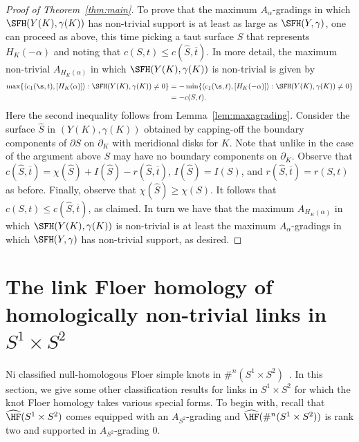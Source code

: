 \documentclass{amsart}
\theoremstyle{definition}
\theoremstyle{remark}
\numberwithin{equation}{section}
\begin{document}
\begin{proof}[Proof of Theorem~\ref{thm:main}]
  To prove that the maximum $A_\alpha$-gradings in which $\SFH(Y(K),\gamma(K))$ has non-trivial support is at least as large as $\SFH(Y,\gamma)$, one can proceed as above, this time picking a taut surface $S$ that represents $H_K(-\alpha)$ and noting that $c(S,t)\leq c(\widehat{S},\overline{t})$. In more detail, the maximum non-trivial $A_{H_K(\alpha)}$ in which $\SFH(Y(K),\gamma(K))$ is non-trivial is given by \begin{align*}\max\{\langle c_1(\s,t),[H_K(\alpha)]\rangle:\SFH(Y(K),\gamma(K))\neq 0\}&=-\min\{\langle c_1(\s,t),[H_K(-\alpha)]\rangle:\SFH(Y(K),\gamma(K))\neq 0\}\\&= -c(S,t). \end{align*} Here the second inequality follows from Lemma~\ref{lem:maxagrading}. Consider the surface $\widehat{S}$ in $(Y(K),\gamma(K))$ obtained by capping-off the boundary components of $\partial S$ on $\partial_K$ with meridional disks for $K$. Note that unlike in the case of the argument above $S$ may have no boundary components on $\partial_K$. Observe that $c(\widehat{S},\overline{t})=\chi(\widehat{S})+I(\widehat{S})-r(\widehat{S},\overline{t})$, $I(\widehat{S})=I(S)$, and $r(\widehat{S},\overline{t})=r(S,t)$ as before.  Finally, observe that $\chi(\widehat{S})\geq\chi(S)$. It follows that $c(S,t)\leq c(\widehat{S},\overline{t})$, as claimed. In turn we have that the maximum $A_{H_K(\alpha)}$ in which $\SFH(Y(K),\gamma(K))$ is non-trivial is at least the maximum $A_\alpha$-gradings in which $\SFH(Y,\gamma)$ has non-trivial support, as desired.\end{proof}










\section{The link Floer homology of homologically non-trivial links in $S^1\times S^2$}\label{sec:S1S2}

Ni classified null-homologous Floer simple knots in $\#^n(S^1\times S^2)$~\cite[Theorem 1.3]{ni2014homological}. In this section, we give some other classification results for links in $S^1\times S^2$ for which the knot Floer homology takes various special forms. To begin with, recall that $\widehat{\HF}(S^1\times S^2)$ comes equipped with an $A_{S^2}$-grading and
    $\widehat{\HF}(\#^n(S^1\times S^2))$ is rank two and supported in $A_{S^2}$-grading $0$.
\end{document}
